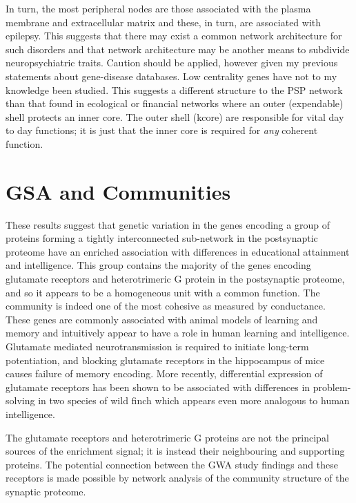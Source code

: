 In turn, the most peripheral nodes are those associated with the plasma membrane and extracellular matrix and these, in turn, are associated with epilepsy. This suggests that there may exist a common network architecture for such disorders and that network architecture may be another means to subdivide neuropsychiatric traits. Caution should be applied, however given my previous statements about gene-disease databases. Low centrality genes have not to my knowledge been studied. This suggests a different structure to the PSP network than that found in ecological or financial networks where an outer (expendable) shell protects an inner core\cite{burleson2020k}. The outer shell (kcore) are responsible for vital day to day functions; it is just that the inner core is required for \textit{any} coherent function. 

	
\section{GSA and Communities}
These results suggest that genetic variation in the genes encoding a group of proteins forming a tightly interconnected sub-network in the postsynaptic proteome have an enriched association with differences in educational attainment and intelligence. This group contains the majority of the genes encoding glutamate receptors and heterotrimeric G protein in the postsynaptic proteome, and so it appears to be a homogeneous unit with a common function. The community is indeed one of the most cohesive as measured by conductance. These genes are commonly associated with animal models of learning and memory and intuitively appear to have a role in human learning and intelligence. Glutamate mediated neurotransmission is required to initiate long-term potentiation, and blocking glutamate receptors in the hippocampus of mice causes failure of memory encoding.  More recently, differential expression of glutamate receptors has been shown to be associated with differences in problem-solving in two species of wild finch\cite{audet2018divergence} which appears even more analogous to human intelligence. 


The glutamate receptors and heterotrimeric G proteins are not the principal sources of the enrichment signal; it is instead their neighbouring and supporting proteins. The potential connection between the GWA study findings and these receptors is made possible by network analysis of the community structure of the synaptic proteome.


